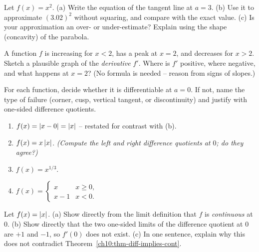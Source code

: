 \begin{exercise}
\label{ch10:ex-tangent}
Let $f(x) = x^2$. (a) Write the equation of the tangent line at $a = 3$. (b) Use
it to approximate $(3.02)^2$ without squaring, and compare with the exact value.
(c) Is your approximation an over- or under-estimate? Explain using the shape
(concavity) of the parabola.
\end{exercise}

\begin{exercise}
\label{ch10:ex-reading}
A function $f$ is increasing for $x < 2$, has a peak at $x = 2$, and decreases for
$x > 2$. Sketch a plausible graph of the \emph{derivative} $f'$. Where is $f'$
positive, where negative, and what happens at $x = 2$? (No formula is needed --
reason from signs of slopes.)
\end{exercise}

\begin{exercise}
\label{ch10:ex-fails}
For each function, decide whether it is differentiable at $a = 0$. If not, name
the type of failure (corner, cusp, vertical tangent, or discontinuity) and justify
with one-sided difference quotients.
\begin{enumerate}[label=(\alph*)]
  \item $f(x) = \lvert x - 0\rvert = \lvert x\rvert$ -- restated for contrast with (b).
  \item $f(x) = x\,\lvert x\rvert$. \emph{(Compute the left and right difference
  quotients at $0$; do they agree?)}
  \item $f(x) = x^{1/3}$.
  \item $f(x) = \begin{cases} x & x \ge 0,\\ x - 1 & x < 0.\end{cases}$
\end{enumerate}
\end{exercise}

\begin{exercise}
\label{ch10:ex-cont-not-diff}
Let $f(x) = \lvert x\rvert$. (a) Show directly from the limit definition that $f$ is
\emph{continuous} at $0$. (b) Show directly that the two one-sided limits of the
difference quotient at $0$ are $+1$ and $-1$, so $f'(0)$ does not exist. (c) In one
sentence, explain why this does not contradict
Theorem~\ref{ch10:thm-diff-implies-cont}.
\end{exercise}

